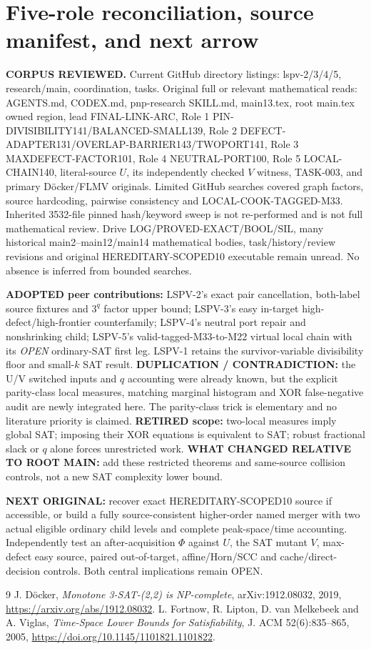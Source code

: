 \documentclass[11pt]{article}
\begin{document}
\section{Five-role reconciliation, source manifest, and next arrow}
\textbf{CORPUS REVIEWED.} Current GitHub directory listings: lspv-2/3/4/5, research/main, coordination, tasks. Original full or relevant mathematical reads: AGENTS.md, CODEX.md, pnp-research SKILL.md, main13.tex, root main.tex owned region, lead FINAL-LINK-ARC, Role 1 PIN-DIVISIBILITY141/BALANCED-SMALL139, Role 2 DEFECT-ADAPTER131/OVERLAP-BARRIER143/TWOPORT141, Role 3 MAXDEFECT-FACTOR101, Role 4 NEUTRAL-PORT100, Role 5 LOCAL-CHAIN140, literal-source $U$, its independently checked $V$ witness, TASK-003, and primary Döcker/FLMV originals. Limited GitHub searches covered graph factors, source hardcoding, pairwise consistency and LOCAL-COOK-TAGGED-M33. Inherited 3532-file pinned hash/keyword sweep is not re-performed and is not full mathematical review. Drive LOG/PROVED-EXACT/BOOL/SIL, many historical main2--main12/main14 mathematical bodies, task/history/review revisions and original HEREDITARY-SCOPED10 executable remain unread. No absence is inferred from bounded searches.
\par\noindent \textbf{ADOPTED peer contributions:} LSPV-2's exact pair cancellation, both-label source fixtures and $3^q$ factor upper bound; LSPV-3's easy in-target high-defect/high-frontier counterfamily; LSPV-4's neutral port repair and nonshrinking child; LSPV-5's valid-tagged-M33-to-M22 virtual local chain with its \emph{OPEN} ordinary-SAT first leg. LSPV-1 retains the survivor-variable divisibility floor and small-$k$ SAT result. \textbf{DUPLICATION / CONTRADICTION:} the U/V switched inputs and $q$ accounting were already known, but the explicit parity-class local measures, matching marginal histogram and XOR false-negative audit are newly integrated here. The parity-class trick is elementary and no literature priority is claimed. \textbf{RETIRED scope:} two-local measures imply global SAT; imposing their XOR equations is equivalent to SAT; robust fractional slack or $q$ alone forces unrestricted work. \textbf{WHAT CHANGED RELATIVE TO ROOT MAIN:} add these restricted theorems and same-source collision controls, not a new SAT complexity lower bound.
\par\noindent \textbf{NEXT ORIGINAL:} recover exact HEREDITARY-SCOPED10 source if accessible, or build a fully source-consistent higher-order named merger with two actual eligible ordinary child levels and complete peak-space/time accounting. Independently test an after-acquisition $\Phi$ against $U$, the SAT mutant $V$, max-defect easy source, paired out-of-target, affine/Horn/SCC and cache/direct-decision controls. Both central implications remain OPEN.
\begin{thebibliography}{9}
 J. D\"ocker, \emph{Monotone 3-SAT-(2,2) is NP-complete}, arXiv:1912.08032, 2019, \url{https://arxiv.org/abs/1912.08032}.
 L. Fortnow, R. Lipton, D. van Melkebeek and A. Viglas, \emph{Time-Space Lower Bounds for Satisfiability}, J. ACM 52(6):835--865, 2005, \url{https://doi.org/10.1145/1101821.1101822}.
\end{thebibliography}
\end{document}
